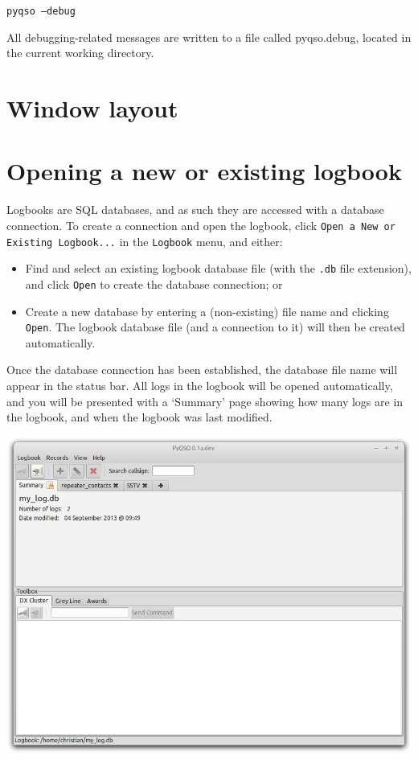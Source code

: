 \documentclass[11pt, a4paper]{report}
\begin{document}
  \texttt{pyqso --debug}

\noindent All debugging-related messages are written to a file called pyqso.debug, located in the current working directory.


\section{Window layout}



\section{Opening a new or existing logbook}
Logbooks are SQL databases, and as such they are accessed with a database connection. To create a connection and open the logbook, click \texttt{Open a New or Existing Logbook...} in the \texttt{Logbook} menu, and either:
\begin{itemize}
  \item Find and select an existing logbook database file (with the \texttt{.db} file extension), and click \texttt{Open} to create the database connection; or
  \item Create a new database by entering a (non-existing) file name and clicking \texttt{Open}. The logbook database file (and a connection to it) will then be created automatically.
\end{itemize}
Once the database connection has been established, the database file name will appear in the status bar. All logs in the logbook will be opened automatically, and you will be presented with a `Summary' page showing how many logs are in the logbook, and when the logbook was last modified.

\begin{center}
  \includegraphics[width=1\columnwidth]{images/summary.png}
\end{center}
\end{document}
